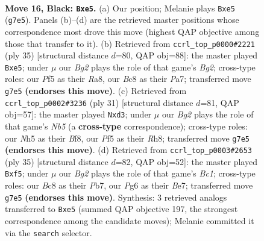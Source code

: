 \documentclass[11pt]{article}
\begin{document}
\clearpage

\begin{figure}[p]\centering
\begin{subfigure}{0.46\textwidth}\centering
\resizebox{\linewidth}{!}{%
\newchessgame
\chessboard[
  setfen={r1b2rk1/pp4bp/6p1/2pnNp1n/7P/4P1P1/PP1P1P2/RNB1RK1B b - - 0 16},
  showmover=false,
  pgfstyle=straightmove, color=movearrow, markmove={g7-e5}
]}
\caption{}
\end{subfigure}\hfill
\begin{subfigure}{0.46\textwidth}\centering
\resizebox{\linewidth}{!}{%
\newchessgame
\chessboard[
  setfen={r1r3k1/p3ppbp/2p3p1/N1pnNb2/8/2P4P/PP1P1PP1/R1B1R1K1 b - - 2 18},
  showmover=false,
  pgfstyle=straightmove, color=movearrow, markmove={g7-e5}
]}
\caption{}
\end{subfigure}
\\[4pt]
\begin{subfigure}{0.46\textwidth}\centering
\resizebox{\linewidth}{!}{%
\newchessgame
\chessboard[
  setfen={r3kb1r/1b1p1ppp/p3p3/1p2P3/1n1BNP2/3B2P1/PPP4P/1K1RR3 b kq - 2 16},
  showmover=false,
  pgfstyle=straightmove, color=movearrow, markmove={b4-d3}
]}
\caption{}
\end{subfigure}\hfill
\begin{subfigure}{0.46\textwidth}\centering
\resizebox{\linewidth}{!}{%
\newchessgame
\chessboard[
  setfen={r1b2rk1/1pp1bpp1/p6p/4pN2/2n1P3/2P5/PPB2PPP/R1BR2K1 b - - 4 18},
  showmover=false,
  pgfstyle=straightmove, color=movearrow, markmove={c8-f5}
]}
\caption{}
\end{subfigure}
\caption{\textbf{Move 16, Black: \texttt{Bxe5}.} (a) Our position; Melanie plays \texttt{Bxe5} (\texttt{g7e5}). Panels (b)--(d) are the retrieved master positions whose correspondence most drove this move (highest QAP objective among those that transfer to it). (b) Retrieved from \texttt{ccrl\_top\_p0000\#2221} (ply 35) [structural distance $d$=80, QAP obj=88]: the master played \texttt{Bxe5}; under $\mu$ our \emph{Bg2} plays the role of that game's \emph{Bg2}; cross-type roles: our \emph{P}f5 as their \emph{R}a8, our \emph{B}c8 as their \emph{P}a7; transferred move \texttt{g7e5} \textbf{(endorses this move)}. (c) Retrieved from \texttt{ccrl\_top\_p0002\#3236} (ply 31) [structural distance $d$=81, QAP obj=57]: the master played \texttt{Nxd3}; under $\mu$ our \emph{Bg2} plays the role of that game's \emph{Nb5} (a \textbf{cross-type} correspondence); cross-type roles: our \emph{N}h5 as their \emph{B}f8, our \emph{P}f5 as their \emph{R}h8; transferred move \texttt{g7e5} \textbf{(endorses this move)}. (d) Retrieved from \texttt{ccrl\_top\_p0003\#2653} (ply 35) [structural distance $d$=82, QAP obj=52]: the master played \texttt{Bxf5}; under $\mu$ our \emph{Bg2} plays the role of that game's \emph{Bc1}; cross-type roles: our \emph{B}c8 as their \emph{P}b7, our \emph{P}g6 as their \emph{B}e7; transferred move \texttt{g7e5} \textbf{(endorses this move)}. Synthesis: 3 retrieved analogs transferred to \texttt{Bxe5} (summed QAP objective 197, the strongest correspondence among the candidate moves); Melanie committed it via the \texttt{search} selector.}
\label{fig:thought-m31}
\end{figure}
\end{document}
